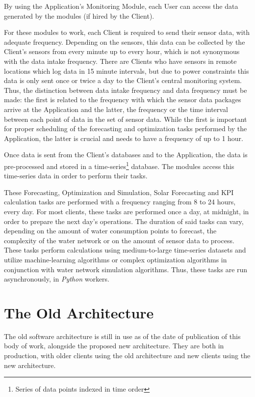 By using the Application's Monitoring Module, each User can access the data generated by the modules (if hired by the Client). 

For these modules to work, each Client is required to send their sensor data, with adequate frequency. Depending on the sensors, this data can be collected by the Client's sensors from every minute up to every hour, which is not synonymous with the data intake frequency. There are Clients who have sensors in remote locations which log data in 15 minute intervals, but due to power constraints this data is only sent once or twice a day to the Client's central monitoring system. Thus, the distinction between data intake frequency and data frequency must be made: the first is related to the frequency with which the sensor data packages arrive at the Application and the latter, the frequency or the time interval between each point of data in the set of sensor data. While the first is important for proper scheduling of the forecasting and optimization tasks performed by the Application, the latter is crucial and needs to have a frequency of up to 1 hour. 

Once data is sent from the Client's databases and to the Application, the data is pre-processed and stored in a time-series\footnote{Series of data points indexed in time order}\label{foot:timeseries} database. The modules access this time-series data in order to perform their tasks. 

These Forecasting, Optimization and Simulation, Solar Forecasting and KPI calculation tasks are performed with a frequency ranging from 8 to 24 hours, every day. For most clients, these tasks are performed once a day, at midnight, in order to prepare the next day's operations. The duration of said tasks can vary, depending on the amount of water consumption points to forecast, the complexity of the water network or on the amount of sensor data to process. These tasks perform calculations using medium-to-large time-series datasets and utilize machine-learning algorithms or complex optimization algorithms in conjunction with water network simulation algorithms. Thus, these tasks are run asynchronously, in \textit{Python} workers.



\section{The Old Architecture}\label{methodology:s:the-old-architecture}

The old software architecture is still in use as of the date of publication of this body of work, alongside the proposed new architecture. They are both in production, with older clients using the old architecture and new clients using the new architecture.  

